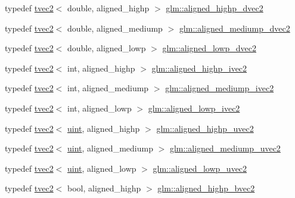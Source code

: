 \begin{DoxyCompactItemize}
\item 
typedef \mbox{\hyperlink{structglm_1_1tvec2}{tvec2}}$<$ double, aligned\+\_\+highp $>$ \mbox{\hyperlink{group__gtc__type__aligned_gaaaaceecde7bb178eebc873836c7e6009}{glm\+::aligned\+\_\+highp\+\_\+dvec2}}
\item 
typedef \mbox{\hyperlink{structglm_1_1tvec2}{tvec2}}$<$ double, aligned\+\_\+mediump $>$ \mbox{\hyperlink{group__gtc__type__aligned_ga7b8277f7fd1d4c9d824685d12080db4f}{glm\+::aligned\+\_\+mediump\+\_\+dvec2}}
\item 
typedef \mbox{\hyperlink{structglm_1_1tvec2}{tvec2}}$<$ double, aligned\+\_\+lowp $>$ \mbox{\hyperlink{group__gtc__type__aligned_ga34c204b5e816428a4ad5b0489fe8aa48}{glm\+::aligned\+\_\+lowp\+\_\+dvec2}}
\item 
typedef \mbox{\hyperlink{structglm_1_1tvec2}{tvec2}}$<$ int, aligned\+\_\+highp $>$ \mbox{\hyperlink{group__gtc__type__aligned_ga9fe485a34b77916c1817ab4ba2ad3b20}{glm\+::aligned\+\_\+highp\+\_\+ivec2}}
\item 
typedef \mbox{\hyperlink{structglm_1_1tvec2}{tvec2}}$<$ int, aligned\+\_\+mediump $>$ \mbox{\hyperlink{group__gtc__type__aligned_ga7c713a802c9a63481c0bab775e16d003}{glm\+::aligned\+\_\+mediump\+\_\+ivec2}}
\item 
typedef \mbox{\hyperlink{structglm_1_1tvec2}{tvec2}}$<$ int, aligned\+\_\+lowp $>$ \mbox{\hyperlink{group__gtc__type__aligned_gaa68001df1954981214e828384e776d8e}{glm\+::aligned\+\_\+lowp\+\_\+ivec2}}
\item 
typedef \mbox{\hyperlink{structglm_1_1tvec2}{tvec2}}$<$ \mbox{\hyperlink{group__core__precision_ga4fd29415871152bfb5abd588334147c8}{uint}}, aligned\+\_\+highp $>$ \mbox{\hyperlink{group__gtc__type__aligned_gadbe09d1af82957ec00a3baaa89120f1e}{glm\+::aligned\+\_\+highp\+\_\+uvec2}}
\item 
typedef \mbox{\hyperlink{structglm_1_1tvec2}{tvec2}}$<$ \mbox{\hyperlink{group__core__precision_ga4fd29415871152bfb5abd588334147c8}{uint}}, aligned\+\_\+mediump $>$ \mbox{\hyperlink{group__gtc__type__aligned_ga4f1b08e51e44ae6de175343f10ec54a7}{glm\+::aligned\+\_\+mediump\+\_\+uvec2}}
\item 
typedef \mbox{\hyperlink{structglm_1_1tvec2}{tvec2}}$<$ \mbox{\hyperlink{group__core__precision_ga4fd29415871152bfb5abd588334147c8}{uint}}, aligned\+\_\+lowp $>$ \mbox{\hyperlink{group__gtc__type__aligned_gae35234d451a8160abf2915753e015269}{glm\+::aligned\+\_\+lowp\+\_\+uvec2}}
\item 
typedef \mbox{\hyperlink{structglm_1_1tvec2}{tvec2}}$<$ bool, aligned\+\_\+highp $>$ \mbox{\hyperlink{group__gtc__type__aligned_ga0864e6acd440d07a7eff815da8990467}{glm\+::aligned\+\_\+highp\+\_\+bvec2}}

\end{DoxyCompactItemize}
